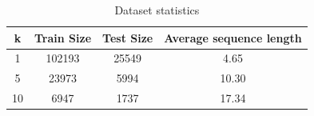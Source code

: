 \documentclass[prodmode,acmtecs]{acmsmall} %
\begin{document}
\begin{table}[]
	\centering
	\caption{Dataset statistics}
	\label{data}
	\begin{tabular}{|c|c|c|c|}
		\hline
		\textbf{k} & \textbf{Train Size} & \textbf{Test Size} & \textbf{Average sequence length} \\ \hline
		1          & 102193              & 25549              & 4.65                             \\ \hline
		5          & 23973               & 5994               & 10.30                            \\ \hline
		10         & 6947                & 1737               & 17.34                            \\ \hline
	\end{tabular}
\end{table}
\end{document}
